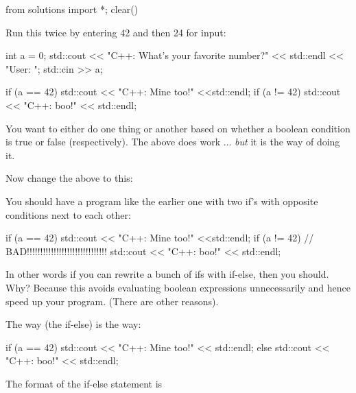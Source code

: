 \begin{python0}
from solutions import *; clear()
\end{python0}

Run this twice by entering 42 and then 24 for input:
\begin{console}
int a = 0;
std::cout << "C++: What's your favorite number?"
          << std::endl << "User: ";
std::cin >> a;

if (a == 42)
   std::cout << "C++: Mine too!" <<std::endl;
if (a != 42)
   std::cout << "C++: boo!" << std::endl;
\end{console}

You want to either do one thing or another based on whether a boolean
condition is true or false (respectively). The above does work ...
\textit{but} it is the  way of doing it.

Now change the above to this:

You should  have a program like the earlier one with two
if's with opposite conditions next to each other:
\begin{console}
if (a == 42)
   std::cout << "C++: Mine too!" <<std::endl;
if (a != 42)      // BAD!!!!!!!!!!!!!!!!!!!!!!!!!!!!!!
   std::cout << "C++: boo!" << std::endl;
\end{console}

In other words if you can rewrite a bunch of ifs with if-else, then you
should. Why? Because this avoids evaluating boolean expressions
unnecessarily and hence speed up your program. (There are other
reasons).

The  way (the if-else) is the  way:

\begin{console}
if (a == 42)
   std::cout << "C++: Mine too!" << std::endl;
else
   std::cout << "C++: boo!" << std::endl;
\end{console}

The format of the if-else statement is
\begin{center}
\\
\EMPHASIZE{\texttt{[stmt1]}}\\
\\
\EMPHASIZE{\texttt{[stmt2]}}\\
\end{center}

